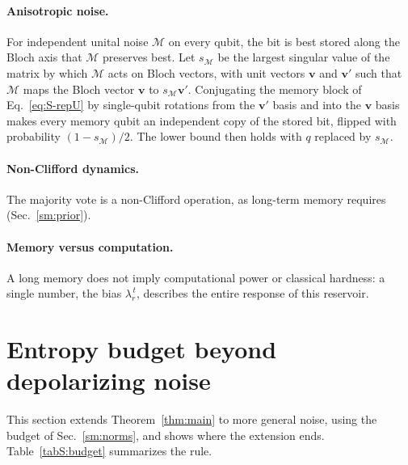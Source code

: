 \documentclass[aps,prl,twocolumn,superscriptaddress,floatfix]{revtex4-2}
\theoremstyle{plain}
\begin{document}
\paragraph*{Anisotropic noise.} For independent unital noise $\mathcal M$ on every qubit, the bit is best stored along the Bloch axis that $\mathcal M$ preserves best. Let $s_{\mathcal M}$ be the largest singular value of the matrix by which $\mathcal M$ acts on Bloch vectors, with unit vectors $\bm v$ and $\bm v'$ such that $\mathcal M$ maps the Bloch vector $\bm v$ to $s_{\mathcal M}\bm v'$. Conjugating the memory block of Eq.~\eqref{eq:S-repU} by single-qubit rotations from the $\bm v'$ basis and into the $\bm v$ basis makes every memory qubit an independent copy of the stored bit, flipped with probability $(1-s_{\mathcal M})/2$. The lower bound then holds with $q$ replaced by $s_{\mathcal M}$.

\paragraph*{Non-Clifford dynamics.} The majority vote is a non-Clifford operation, as long-term memory requires~\cite{Nelson2026} (Sec.~\ref{sm:prior}).

\paragraph*{Memory versus computation.} A long memory does not imply computational power or classical hardness: a single number, the bias $\lambda_r^{\,t}$, describes the entire response of this reservoir.

\section{Entropy budget beyond depolarizing noise}
\label{sm:budget}

This section extends Theorem~\ref{thm:main} to more general noise, using the budget of Sec.~\ref{sm:norms}, and shows where the extension ends. Table~\ref{tabS:budget} summarizes the rule.
\end{document}
